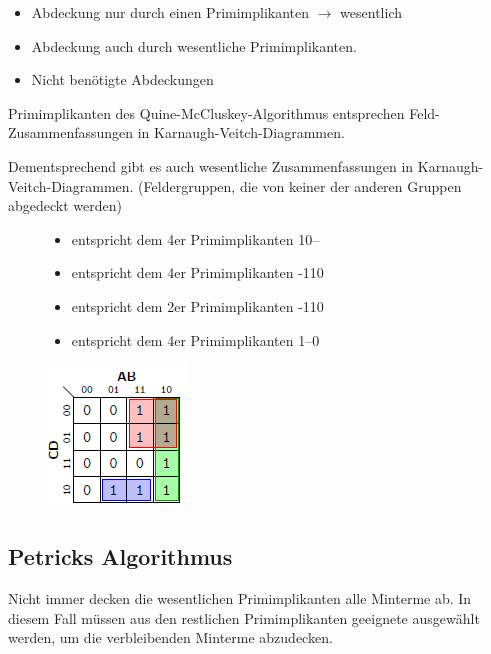 \documentclass[12pt]{report}
\begin{document}
\begin{enumerate}
        \begin{itemize}
          \item[\color{red} $\bullet$ ] Abdeckung nur durch einen Primimplikanten $\rightarrow$ wesentlich
          \item[\color{blue} $\bullet$ ] Abdeckung auch durch wesentliche Primimplikanten.
          \item[\color{gray} $\bullet$ ] Nicht benötigte Abdeckungen
        \end{itemize}
\end{enumerate}


\begin{infobox}
  Primimplikanten des Quine-McCluskey-Algorithmus entsprechen 
  Feld-Zusammenfassungen in Karnaugh-Veitch-Diagrammen.
  
  Dementsprechend gibt es auch wesentliche Zusammenfassungen in Karnaugh-Veitch-Diagrammen. 
  (Feldergruppen, die von keiner der anderen Gruppen abgedeckt werden)
\end{infobox}
\begin{figure}[h]
  \begin{minipage}{0.6\textwidth}
    \begin{itemize}
      \item[\color{green} Grün] entspricht dem 4er Primimplikanten 10--
      \item[\color{red} Rot\ ] entspricht dem 4er Primimplikanten -110
      \item[\color{blue} Blau] entspricht dem 2er Primimplikanten -110
      \item[\color{yellow} Gelb] entspricht dem 4er Primimplikanten 1--0
    \end{itemize}
  \end{minipage}
  \hfill
  \begin{minipage}{0.4\textwidth}
    \includegraphics{graphics/karnaugh-veitch-step_03.png}
  \end{minipage}
\end{figure}

\subsection{Petricks Algorithmus}
Nicht immer decken die wesentlichen Primimplikanten alle Minterme ab. 
In diesem Fall müssen aus den restlichen Primimplikanten geeignete ausgewählt werden, 
um die verbleibenden Minterme abzudecken.
\end{document}
